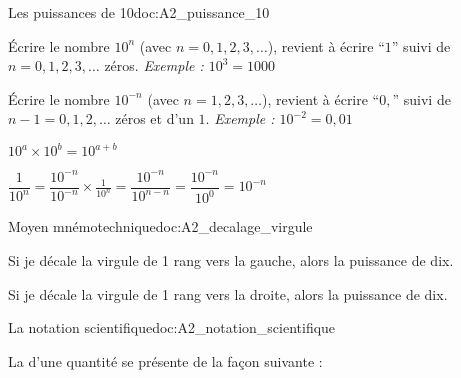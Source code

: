 \teteSndMeth



\vspace*{-24pt}

\begin{doc}{Les puissances de 10}{doc:A2_puissance_10}
  \begin{importants}
  \begin{listePoints}
    \item Écrire le nombre $10^n$ (avec $n = 0, 1, 2, 3, \ldots$), revient à écrire ``$1$'' suivi de $n = 0, 1, 2, 3, \ldots$ zéros. \textit{Exemple : $10^3 = 1000$}
    \item Écrire le nombre $10^{-n}$ (avec $n = 1, 2, 3, \ldots$), revient à écrire ``$0,$'' suivi de $n - 1 = 0, 1, 2, \ldots$ zéros et d'un $1$. \textit{Exemple : $10^{-2} = 0,\!01$}
    \item $10^a \times 10^b = 10^{a + b}$
    \item $\dfrac{1}{10^n} 
    = \dfrac{10^{-n}}{10^{-n}} \times \frac{1}{10^n} 
    = \dfrac{10^{-n}}{10^{n - n}}
    = \dfrac{10^{-n}}{10^0}
    = 10^{-n}$
  \end{listePoints}
  \end{importants}
\end{doc}
\bigskip

\begin{doc}{Moyen mnémotechnique}{doc:A2_decalage_virgule}
  \begin{listePoints}
    \item Si je décale la virgule de 1 rang vers la gauche, alors  la puissance de dix.
    \item Si je décale la virgule de 1 rang vers la droite, alors 
    la puissance de dix.
  \end{listePoints}
\end{doc}

\begin{doc}{La notation scientifique}{doc:A2_notation_scientifique}
  \begin{importants}
  La  d'une quantité se présente de la façon suivante :
  \begin{center}
    \qq{}
    \qq{}
  \end{center}
  \vspace*{-30pt} \hspace*{4pt}
  \end{importants}
\end{doc}

